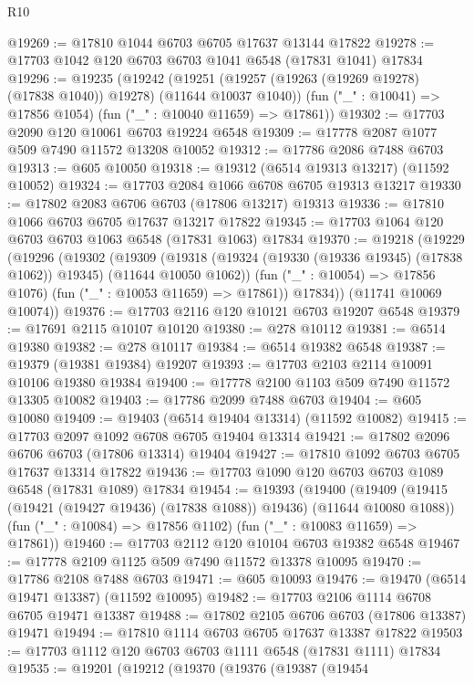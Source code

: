 \begin{lexlean}{R10}
\begin{coremodule}
@19269 := @17810 @1044 @6703 @6705 @17637 @13144 @17822
@19278 := @17703 @1042 @120 @6703 @6703 @1041 @6548 (@17831 @1041) @17834
@19296 := @19235
    (@19242
      (@19251 (@19257 (@19263 (@19269 @19278) (@17838 @1040)) @19278) (@11644 @10037 @1040))
      (fun ("_" : @10041) => @17856 @1054)
      (fun ("_" : @10040 @11659) => @17861))
@19302 := @17703 @2090 @120 @10061 @6703 @19224 @6548
@19309 := @17778 @2087 @1077 @509 @7490 @11572 @13208 @10052
@19312 := @17786 @2086 @7488 @6703
@19313 := @605 @10050
@19318 := @19312 (@6514 @19313 @13217) (@11592 @10052)
@19324 := @17703 @2084 @1066 @6708 @6705 @19313 @13217
@19330 := @17802 @2083 @6706 @6703 (@17806 @13217) @19313
@19336 := @17810 @1066 @6703 @6705 @17637 @13217 @17822
@19345 := @17703 @1064 @120 @6703 @6703 @1063 @6548 (@17831 @1063) @17834
@19370 := @19218
    (@19229
      (@19296
        (@19302
          (@19309
            (@19318 (@19324 (@19330 (@19336 @19345) (@17838 @1062)) @19345) (@11644 @10050 @1062))
            (fun ("_" : @10054) => @17856 @1076)
            (fun ("_" : @10053 @11659) => @17861))
          @17834))
      (@11741 @10069 @10074))
@19376 := @17703 @2116 @120 @10121 @6703 @19207 @6548
@19379 := @17691 @2115 @10107 @10120
@19380 := @278 @10112
@19381 := @6514 @19380
@19382 := @278 @10117
@19384 := @6514 @19382 @6548
@19387 := @19379 (@19381 @19384) @19207
@19393 := @17703 @2103 @2114 @10091 @10106 @19380 @19384
@19400 := @17778 @2100 @1103 @509 @7490 @11572 @13305 @10082
@19403 := @17786 @2099 @7488 @6703
@19404 := @605 @10080
@19409 := @19403 (@6514 @19404 @13314) (@11592 @10082)
@19415 := @17703 @2097 @1092 @6708 @6705 @19404 @13314
@19421 := @17802 @2096 @6706 @6703 (@17806 @13314) @19404
@19427 := @17810 @1092 @6703 @6705 @17637 @13314 @17822
@19436 := @17703 @1090 @120 @6703 @6703 @1089 @6548 (@17831 @1089) @17834
@19454 := @19393
    (@19400
      (@19409 (@19415 (@19421 (@19427 @19436) (@17838 @1088)) @19436) (@11644 @10080 @1088))
      (fun ("_" : @10084) => @17856 @1102)
      (fun ("_" : @10083 @11659) => @17861))
@19460 := @17703 @2112 @120 @10104 @6703 @19382 @6548
@19467 := @17778 @2109 @1125 @509 @7490 @11572 @13378 @10095
@19470 := @17786 @2108 @7488 @6703
@19471 := @605 @10093
@19476 := @19470 (@6514 @19471 @13387) (@11592 @10095)
@19482 := @17703 @2106 @1114 @6708 @6705 @19471 @13387
@19488 := @17802 @2105 @6706 @6703 (@17806 @13387) @19471
@19494 := @17810 @1114 @6703 @6705 @17637 @13387 @17822
@19503 := @17703 @1112 @120 @6703 @6703 @1111 @6548 (@17831 @1111) @17834
@19535 := @19201
    (@19212
      (@19370
        (@19376
          (@19387
            (@19454

\end{coremodule}
\end{lexlean}
